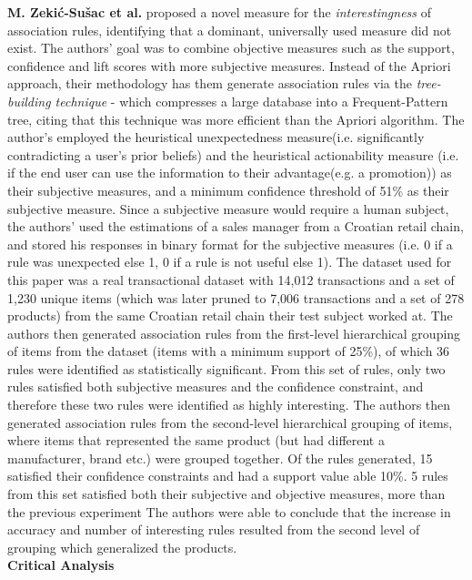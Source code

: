 \documentclass[a4paper,11pt]{article}
\begin{document}
\textbf{M. Zekić-Sušac et al.} \cite{market_ass} proposed a novel measure for the \textit{interestingness} of association rules,  identifying that a dominant, universally used measure did not exist. The authors' goal was to combine objective measures such as the support, confidence and lift scores with more subjective measures. Instead of the Apriori approach, their methodology has them generate association rules via the \textit{tree-building technique} - which compresses a large database into a Frequent-Pattern tree, citing that this technique was more efficient than the Apriori algorithm. The author's employed the heuristical unexpectedness measure(i.e.  significantly contradicting a user's prior beliefs) and the heuristical actionability measure (i.e. if the end user can use the information to their advantage(e.g. a promotion)) as their subjective measures, and a minimum confidence threshold of 51\% as their subjective measure.  Since a subjective measure would require a human subject, the authors' used the estimations of a sales manager from a Croatian retail chain, and stored his responses in binary format for the subjective measures (i.e. 0 if a rule was unexpected else 1, 0 if a rule is not useful else 1). The dataset used for this paper was a real transactional dataset with 14,012 transactions and a set of 1,230 unique items (which was later pruned to 7,006 transactions and a set of 278 products) from the same Croatian retail chain their test subject worked at. The authors then generated association rules from the first-level hierarchical grouping of items from the dataset (items with a minimum support of 25\%),  of which 36 rules were identified as statistically significant.  From this set of rules, only two rules satisfied both subjective measures and the confidence constraint, and therefore these two rules were identified as highly interesting.  The authors then generated association rules from the second-level hierarchical grouping of items, where items that represented the same product (but had different a manufacturer, brand etc.) were grouped together. Of the rules generated, 15 satisfied their confidence constraints and had a support value able 10\%. 5 rules from this set satisfied both their subjective and objective measures,  more than the previous experiment  The authors were able to conclude that the increase in accuracy and number of interesting rules resulted from the second level of grouping which generalized the products.\\
\textbf{Critical Analysis}\\
\end{document}
